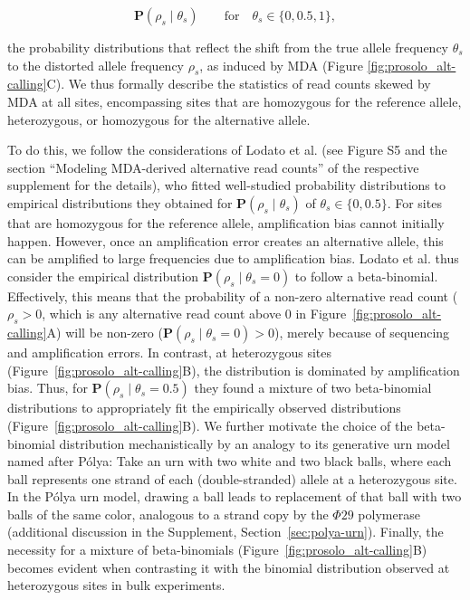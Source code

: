 \documentclass[12pt,inline]{wlscirep}
\begin{document}
\begin{equation}
 \mathbf{P}(\rho_s\mid\theta_s)\qquad \text{for}  \quad\theta_s\in\{0,0.5,1\},
\end{equation}

the probability distributions that reflect the shift from the true allele frequency $\theta_s$ to the distorted allele frequency $\rho_s$, as induced by MDA (Figure \ref{fig:prosolo_alt-calling}C).
We thus formally describe the statistics of read counts skewed by MDA at all sites, encompassing sites that are homozygous for the reference allele, heterozygous, or homozygous for the alternative allele.

To do this, we follow the considerations of Lodato et al.\cite{lodato_somatic_2015} (see Figure S5 and the section ``Modeling MDA-derived alternative read counts'' of the respective supplement for the details), who fitted well-studied probability distributions to empirical distributions they obtained for $\mathbf{P}(\rho_s\mid\theta_s)$ of $\theta_s\in\{0,0.5\}$.
For sites that are homozygous for the reference allele, amplification bias cannot initially happen.
However, once an amplification error creates an alternative allele, this can be amplified to large frequencies due to amplification bias.
Lodato et al.\cite{lodato_somatic_2015} thus consider the empirical distribution $\mathbf{P}(\rho_s\mid\theta_s=0)$ to follow a beta-binomial.
Effectively, this means that the probability of a non-zero alternative read count  ($\rho_s>0$, which is any alternative read count above $0$ in Figure~\ref{fig:prosolo_alt-calling}A) will be non-zero ($\mathbf{P}(\rho_s\mid\theta_s=0)>0$), merely because of sequencing and amplification errors.
In contrast, at heterozygous sites (Figure~\ref{fig:prosolo_alt-calling}B), the distribution is dominated by amplification bias.
Thus, for $\mathbf{P}(\rho_s\mid\theta_s=0.5)$ they found a mixture of two beta-binomial distributions to appropriately fit the empirically observed distributions (Figure~\ref{fig:prosolo_alt-calling}B).
We further motivate the choice of the beta-binomial distribution mechanistically by an analogy to its generative urn model named after Pólya\cite{eggenberger_uber_1923}:
Take an urn with two white and two black balls, where each ball represents one strand of each (double-stranded) allele at a heterozygous site.
In the Pólya urn model, drawing a ball leads to replacement of that ball with two balls of the same color, analogous to a strand copy by the $\Phi29$ polymerase (additional discussion in the Supplement, Section~\ref{sec:polya-urn}).
Finally, the necessity for a mixture of beta-binomials (Figure~\ref{fig:prosolo_alt-calling}B) becomes evident when contrasting it with the binomial distribution observed at heterozygous sites in bulk experiments.
\end{document}
